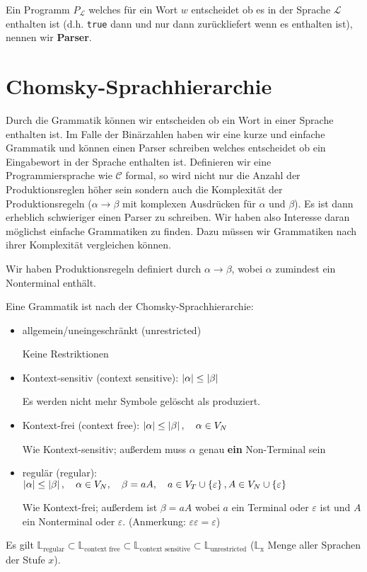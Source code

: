 \begin{defn}
Ein Programm $P_{\mathcal{L}}$ welches für ein Wort $w$ entscheidet ob es in der Sprache $\mathcal{L}$ enthalten ist (d.h. \verb|true| dann und nur dann zurückliefert wenn es enthalten ist), nennen wir \textbf{Parser}.
\end{defn}

\section{Chomsky-Sprachhierarchie}
Durch die Grammatik können wir entscheiden ob ein Wort in einer Sprache enthalten ist.
Im Falle der Binärzahlen haben wir eine kurze und einfache Grammatik und können einen Parser schreiben
welches entscheidet ob ein Eingabewort in der Sprache enthalten ist.
Definieren wir eine Programmiersprache wie $\mathcal{C}$ formal, so wird nicht nur die Anzahl der Produktionsreglen höher sein
sondern auch die Komplexität der Produktionsregeln ($\alpha \to \beta$ mit komplexen Ausdrücken für $\alpha$ und $\beta$).
Es ist dann erheblich schwieriger einen Parser zu schreiben.
Wir haben also Interesse daran möglichst einfache Grammatiken zu finden. Dazu müssen wir
Grammatiken nach ihrer Komplexität vergleichen können.

Wir haben Produktionsregeln definiert durch $\alpha \to \beta$, wobei
$\alpha$ zumindest ein Nonterminal enthält.
\begin{defn}
Eine Grammatik ist nach der Chomsky-Sprachhierarchie:
\begin{itemize}
\item allgemein/uneingeschränkt (unrestricted)

Keine Restriktionen
\item Kontext-sensitiv (context sensitive): $\left\lvert{\alpha}\right\rvert \leq \left\lvert{\beta}\right\rvert$

Es werden nicht mehr Symbole gelöscht als produziert.
\item Kontext-frei (context free): $\left\lvert{\alpha}\right\rvert \leq \left\lvert{\beta}\right\rvert, \quad \alpha \in V_N$

Wie Kontext-sensitiv; außerdem muss $\alpha$ genau \textbf{ein} Non-Terminal sein
\item regulär (regular): $\left\lvert{\alpha}\right\rvert \leq \left\lvert{\beta}\right\rvert, \quad \alpha \in V_N, \quad \beta=aA, \quad a \in V_T \cup \left\{\varepsilon\right\}, A \in V_N \cup \left\{\varepsilon\right\}$

Wie Kontext-frei; außerdem ist $\beta=aA$ wobei $a$ ein Terminal oder $\varepsilon$ ist und $A$ ein Nonterminal oder $\varepsilon$. (Anmerkung: $\varepsilon\varepsilon=\varepsilon$)
\end{itemize}
Es gilt $\mathbb{L}_{\text{regular}} \subset \mathbb{L}_{\text{context free}} \subset \mathbb{L}_{\text{context sensitive}} \subset \mathbb{L}_{\text{unrestricted}}$ ($\mathbb{L}_{\text{x}}$ Menge aller Sprachen der Stufe $x$).
\end{defn}

